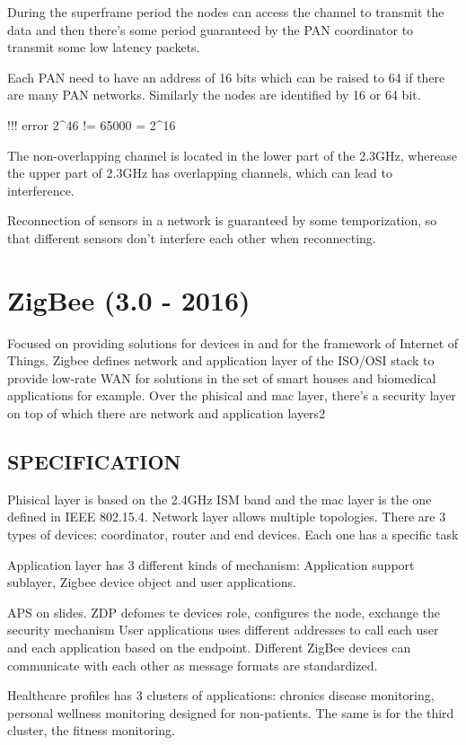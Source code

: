 During the superframe period the nodes can access the channel to transmit the data and then there's  some period guaranteed by the PAN coordinator to transmit some low latency packets.

Each PAN need to have an address of 16 bits which can be raised to 64 if there are many PAN networks. Similarly the nodes are identified by 16 or 64 bit.

!!! error
2^46 != 65000 = 2^16

The non-overlapping channel is located in the lower part of the 2.3GHz, wherease the upper part of 2.3GHz has overlapping channels, which can lead to interference.

Reconnection of sensors in a network is guaranteed by some temporization, so that different sensors don't interfere each other when reconnecting.

\section{ZigBee (3.0 - 2016)}
Focused on providing solutions for devices in and for the framework of Internet of Things.
Zigbee defines network and application layer of the ISO/OSI stack to provide low-rate WAN for solutions in the set of smart houses and biomedical applications for example.
Over the phisical and mac layer, there's a security layer on top of which there are  network and application layers2

\subsection{SPECIFICATION}
Phisical layer is based on the 2.4GHz ISM band and the mac layer is the one defined in IEEE 802.15.4. Network layer allows multiple topologies. There are 3 types of devices: coordinator, router and end devices. Each one has a specific task

Application layer has 3 different kinds of mechanism:
Application support sublayer, Zigbee device object and user applications.

APS on slides.
ZDP defomes te devices role, configures the node, exchange the security mechanism
User applications uses different addresses to call each user and each application based on the endpoint.
Different ZigBee devices can communicate with each other as message formats are standardized.

Healthcare profiles has 3 clusters of applications: chronics disease monitoring, personal wellness monitoring designed for non-patients. The same is for the third cluster, the fitness monitoring.


